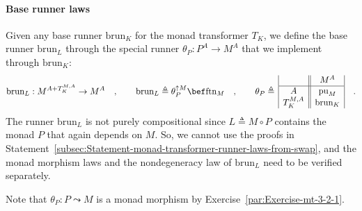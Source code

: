 \paragraph{Base runner laws}

Given any base runner $\text{brun}_{K}$ for the monad transformer
$T_{K}$, we define the base runner $\text{brun}_{L}$ through the
special runner $\theta_{P}:P^{A}\rightarrow M^{A}$ that we implement
through $\text{brun}_{K}$:
\begin{equation}
\text{brun}_{L}:M^{A+T_{K}^{M,A}}\rightarrow M^{A}\quad,\quad\quad\text{brun}_{L}\triangleq\theta_{P}^{\uparrow M}\bef\text{ftn}_{M}\quad,\quad\quad\theta_{P}\triangleq\,\begin{array}{|c||c|}
 & M^{A}\\
\hline A & \text{pu}_{M}\\
T_{K}^{M,A} & \text{brun}_{K}
\end{array}\quad.\label{eq:def-of-brun-and-theta-for-free-pointed}
\end{equation}
The runner $\text{brun}_{L}$ is not purely compositional since $L\triangleq M\circ P$
contains the monad $P$ that again depends on $M$. So, we cannot
use the proofs in Statement~\ref{subsec:Statement-monad-transformer-runner-laws-from-swap},
and the monad morphism laws and the nondegeneracy law of $\text{brun}_{L}$
need to be verified separately.

Note that $\theta_{P}:P\leadsto M$ is a monad morphism by Exercise~\ref{par:Exercise-mt-3-2-1}.

